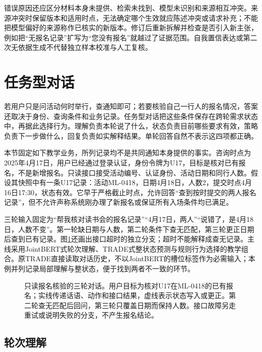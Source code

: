 错误原因还应区分材料本身未提供、检索未找到、模型未识别和来源相互冲突。来源冲突时保留版本和适用时点，无法确定哪个生效就应陈述冲突或请求补充；不能把模型偏好的来源称作已核实的新版本。修订后重新拆解并检查是否引入新主张，例如把“无报名记录”扩写为“您没有报名”就越过了证据范围。自我置信表达或第二次无依据生成不代替独立样本校准与人工复核。

\section{任务型对话}
\label{sec:nlp-dialogue-task}

若用户只是问活动何时举行，查通知即可；若要核验自己一行人的报名情况，答案还取决于身份、查询条件和业务记录。任务型对话把这些条件保存在跨轮需求状态中，再据此选择行为。理解负责本轮说了什么，状态负责目前哪些要求有效，策略负责下一步做什么，回复负责如实解释结果。单轮回答自然不表示这四项都正确。

本节固定如下教学业务，所列记录均不是共同通知本身提供的事实。咨询时点为2025年4月17日，用户已经通过登录认证，身份令牌为U17，目标是核对已有报名，不是新增报名。只读接口接受活动编号、认证身份、活动日期和同行人数。假设其快照中有一条U17记录：活动ML-0418，日期4月18日，人数2，提交时点4月16日17:30，状态有效。它早于严格截止时点，允许回答“查到按时提交的两人报名记录”，但不允许声称系统刚办理了新报名或保证所有入场条件均已满足。

三轮输入固定为“帮我核对读书会的报名记录”“4月17日，两人”“说错了，是4月18日，人数不变”。第一轮缺日期与人数，第二轮条件下查无匹配，第三轮更正日期后查到已有记录。图\ref{fig:nlp-dialogue-state}还画出接口超时的独立分支；超时不能解释成查无记录。主线采用JointBERT式轮次理解、TRADE式整状态预测与规则行为选择的教学组合。原TRADE直接读取对话历史，不以JointBERT的槽位标签作为必需输入；本例并列记录局部理解与整状态，便于找到两者不一致的环节。

\begin{figure}[htbp]
  \centering
  
  \caption{只读报名核验的三轮对话。用户目标为核对U17在ML-0418的已有报名；实线传递话语、动作和接口结果，虚线表示状态写入或更正。第二轮查无匹配后回问，第三轮只覆盖日期而保持人数。接口故障另走重试或说明失败的分支，不产生报名结论。}
  \label{fig:nlp-dialogue-state}
\end{figure}
\FloatBarrier

\subsection{轮次理解}
\label{sec:nlp-dialogue-turn}

